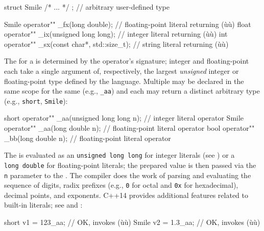 \begin{emcppslisting}
struct Smile { /* ... */ };  // arbitrary user-defined type

Smile operator"" _fx(long double);  // floating-point literal returning (ù{}ù)
float operator"" _ix(unsigned long long);  // integer literal returning (ù{}ù)
int operator"" _sx(const char*, std::size_t);  // string literal returning (ù{}ù)
\end{emcppslisting}
    
\noindent The  for a  is determined by the operator's signature; integer and
floating-point  each take a single argument of,
respectively, the largest \emph{unsigned} integer or floating-point type
defined by the language. Multiple  may be declared in the same scope for the same  (e.g., \lstinline!_aa!) and each may return a distinct arbitrary
type (e.g., \lstinline!short!, \lstinline!Smile!):

\begin{emcppslisting}
short operator"" _aa(unsigned long long n);  // integer literal operator
Smile operator"" _aa(long double n);         // floating-point literal operator
bool  operator"" _bb(long double n);         // floating-point literal operator
\end{emcppslisting}
    
\noindent The  is evaluated as an
\lstinline!unsigned!~\lstinline!long!~\lstinline!long! for integer literals (see ) or a
\lstinline!long!~\lstinline!double! for floating-point literals; the prepared
value is then passed via the \lstinline!n! parameter to the . The compiler does the work of parsing and evaluating the
sequence of digits, radix prefixes (e.g., \lstinline!0! for octal and
\lstinline!0x! for hexadecimal), decimal points, and exponents. C++14
provides additional features related to built-in literals; see  and :

\begin{emcppslisting}
short v1 = 123_aa;  // OK, invokes (ù{}ù)
Smile v2 = 1.3_aa;  // OK, invokes (ù{}ù)
\end{emcppslisting}
    
